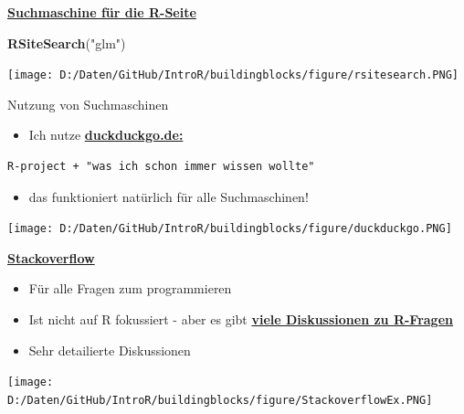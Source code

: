 \documentclass[ignorenonframetext,]{beamer}
\newenvironment{Shaded}{\begin{snugshade}}{\end{snugshade}}
\newcommand{\KeywordTok}[1]{\textcolor[rgb]{0.26,0.66,0.93}{\textbf{#1}}}
\newcommand{\StringTok}[1]{\textcolor[rgb]{0.02,0.61,0.04}{#1}}
\newcommand{\NormalTok}[1]{\textcolor[rgb]{0.74,0.68,0.62}{#1}}
\providecommand{\tightlist}{%
  \setlength{\itemsep}{0pt}\setlength{\parskip}{0pt}}
\begin{document}
\begin{frame}[fragile]{\href{http://search.r-project.org/cgi-bin/namazu.cgi?query=glm\&max=20\&result=normal\&sort=score\&idxname=functions\&idxname=vignettes\&idxname=views}{\textbf{Suchmaschine
für die R-Seite}}}

\begin{Shaded}
\begin{Highlighting}[]
\KeywordTok{RSiteSearch}\NormalTok{(}\StringTok{"glm"}\NormalTok{)}
\end{Highlighting}
\end{Shaded}

\texttt{[image: D:/Daten/GitHub/IntroR/buildingblocks/figure/rsitesearch.PNG]}

\end{frame}

\begin{frame}[fragile]{Nutzung von Suchmaschinen}

\begin{itemize}
\tightlist
\item
  Ich nutze \href{}{\textbf{duckduckgo.de:}}
\end{itemize}

\begin{verbatim}
R-project + "was ich schon immer wissen wollte" 
\end{verbatim}

\begin{itemize}
\tightlist
\item
  das funktioniert natürlich für alle Suchmaschinen!
\end{itemize}

\texttt{[image: D:/Daten/GitHub/IntroR/buildingblocks/figure/duckduckgo.PNG]}

\end{frame}

\begin{frame}{\href{http://stackoverflow.com/}{\textbf{Stackoverflow}}}

\begin{itemize}
\tightlist
\item
  Für alle Fragen zum programmieren
\item
  Ist nicht auf R fokussiert - aber es gibt
  \href{https://stackoverflow.com/tags/r/info}{\textbf{viele
  Diskussionen zu R-Fragen}}
\item
  Sehr detailierte Diskussionen
\end{itemize}

\texttt{[image: D:/Daten/GitHub/IntroR/buildingblocks/figure/StackoverflowEx.PNG]}

\end{frame}
\end{document}
